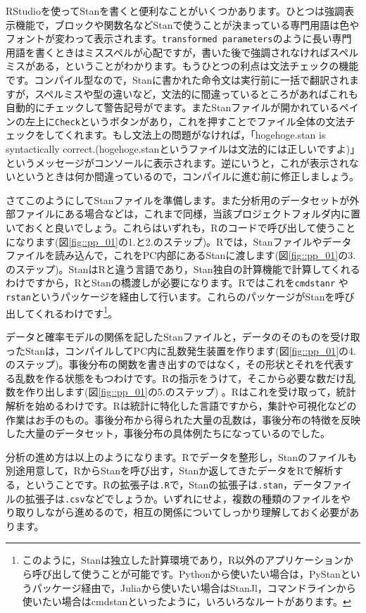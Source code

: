 \documentclass{ltjsbook}
\begin{document}
RStudioを使ってStanを書くと便利なことがいくつかあります。ひとつは強調表示機能で，ブロックや関数名などStanで使うことが決まっている専門用語は色やフォントが変わって表示されます。\verb|transformed parameters|のように長い専門用語を書くときはミススペルが心配ですが，書いた後で強調されなければスペルミスがある，ということがわかります。もうひとつの利点は文法チェックの機能です。コンパイル型なので，Stanに書かれた命令文は実行前に一括で翻訳されますが，スペルミスや型の違いなど，文法的に間違っているところがあればこれも自動的にチェックして警告記号がでます。またStanファイルが開かれているペインの左上に\verb|Check|というボタンがあり，これを押すことでファイル全体の文法チェックをしてくれます。もし文法上の問題がなければ，「hogehoge.stan is syntactically correct.(hogehoge.stanというファイルは文法的には正しいですよ)」というメッセージがコンソールに表示されます。逆にいうと，これが表示されないというときは何か間違っているので，コンパイルに進む前に修正しましょう。

さてこのようにしてStanファイルを準備します。また分析用のデータセットが外部ファイルにある場合などは，これまで同様，当該プロジェクトフォルダ内に置いておくと良いでしょう。これらはいずれも，Rのコードで呼び出して使うことになります(図\ref{fig::pp_01}の1.と2.のステップ)。Rでは，Stanファイルやデータファイルを読み込んで，これをPC内部にあるStanに渡します(図\ref{fig::pp_01}の3.のステップ)。StanはRと違う言語であり，Stan独自の計算機能で計算してくれるわけですから，RとStanの橋渡しが必要になります。Rではこれを\verb|cmdstanr| や\verb|rstan|というパッケージを経由して行います。これらのパッケージがStanを呼び出してくれるわけです\footnote{このように，Stanは独立した計算環境であり，R以外のアプリケーションから呼び出して使うことが可能です。Pythonから使いたい場合は，PyStanというパッケージ経由で，Juliaから使いたい場合はStanJl，コマンドラインから使いたい場合はcmdstanといったように，いろいろなルートがあります。}。

データと確率モデルの関係を記したStanファイルと，データのそのものを受け取ったStanは，コンパイルしてPC内に乱数発生装置を作ります(図\ref{fig::pp_01}の4.のステップ)。事後分布の関数を書き出すのではなく，その形状とそれを代表する乱数を作る状態をもつわけです。Rの指示をうけて，そこから必要な数だけ乱数を作り出します(図\ref{fig::pp_01}の5.のステップ) 。Rはこれを受け取って，統計解析を始めるわけです。Rは統計に特化した言語ですから，集計や可視化などの作業はお手のもの。事後分布から得られた大量の乱数は，事後分布の特徴を反映した大量のデータセット，事後分布の具体例たちになっているのでした。

分析の進め方は以上のようになります。Rでデータを整形し，Stanのファイルも別途用意して，RからStanを呼び出す，Stanか返してきたデータをRで解析する，ということです。Rの拡張子は\verb|.R|で，Stanの拡張子は\verb|.stan|，データファイルの拡張子は\verb|.csv|などでしょうか。いずれにせよ，複数の種類のファイルをやり取りしながら進めるので，相互の関係についてしっかり理解しておく必要があります。
\end{document}
